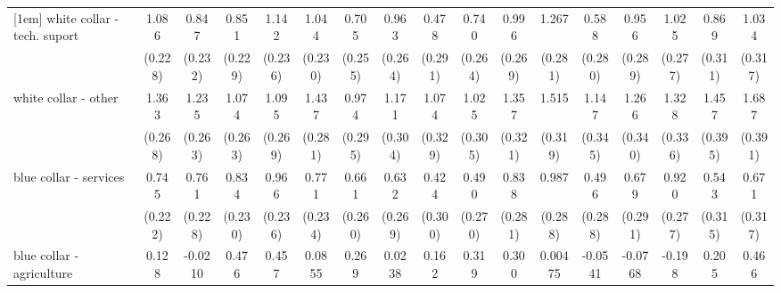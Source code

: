 {\begin{tabular}{l*{16}{c}}
[1em]
white collar - tech. suport&       1.086\sym{***}&       0.847\sym{***}&       0.851\sym{***}&       1.142\sym{***}&       1.044\sym{***}&       0.705\sym{**} &       0.963\sym{***}&       0.478         &       0.740\sym{**} &       0.996\sym{***}&       1.267\sym{***}&       0.588\sym{*}  &       0.956\sym{***}&       1.025\sym{***}&       0.869\sym{**} &       1.034\sym{**} \\
                    &     (0.228)         &     (0.232)         &     (0.229)         &     (0.236)         &     (0.230)         &     (0.255)         &     (0.264)         &     (0.291)         &     (0.264)         &     (0.269)         &     (0.281)         &     (0.280)         &     (0.289)         &     (0.277)         &     (0.311)         &     (0.317)         \\
[1em]
white collar - other&       1.363\sym{***}&       1.235\sym{***}&       1.074\sym{***}&       1.095\sym{***}&       1.437\sym{***}&       0.974\sym{***}&       1.171\sym{***}&       1.074\sym{**} &       1.025\sym{***}&       1.357\sym{***}&       1.515\sym{***}&       1.147\sym{***}&       1.266\sym{***}&       1.328\sym{***}&       1.457\sym{***}&       1.687\sym{***}\\
                    &     (0.268)         &     (0.263)         &     (0.263)         &     (0.269)         &     (0.281)         &     (0.295)         &     (0.304)         &     (0.329)         &     (0.305)         &     (0.321)         &     (0.319)         &     (0.345)         &     (0.340)         &     (0.336)         &     (0.395)         &     (0.391)         \\
[1em]
blue collar - services&       0.745\sym{***}&       0.761\sym{***}&       0.834\sym{***}&       0.966\sym{***}&       0.771\sym{***}&       0.661\sym{*}  &       0.632\sym{*}  &       0.424         &       0.490         &       0.838\sym{**} &       0.987\sym{***}&       0.496         &       0.679\sym{*}  &       0.920\sym{***}&       0.543         &       0.671\sym{*}  \\
                    &     (0.222)         &     (0.228)         &     (0.230)         &     (0.236)         &     (0.234)         &     (0.260)         &     (0.269)         &     (0.300)         &     (0.270)         &     (0.281)         &     (0.288)         &     (0.288)         &     (0.291)         &     (0.277)         &     (0.315)         &     (0.317)         \\
[1em]
blue collar - agriculture&       0.128         &     -0.0210         &       0.476         &       0.457         &      0.0855         &       0.269         &      0.0238         &       0.162         &       0.319         &       0.300         &     0.00475         &     -0.0541         &     -0.0768         &      -0.198         &       0.205         &       0.466         \\

\end{tabular}}
